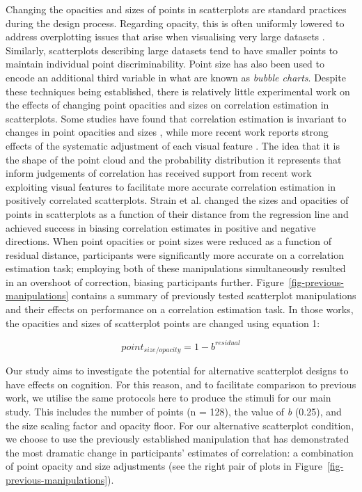 \documentclass[sigconf]{acmart}
\begin{document}
Changing the opacities and sizes of points in scatterplots are standard
practices during the design process. Regarding opacity, this is often
uniformly lowered to address overplotting issues that arise when
visualising very large datasets \citep{matejka_2015}. Similarly,
scatterplots describing large datasets tend to have smaller points to
maintain individual point discriminability. Point size has also been
used to encode an additional third variable in what are known as
\emph{bubble charts}. Despite these techniques being established, there
is relatively little experimental work on the effects of changing point
opacities and sizes on correlation estimation in scatterplots. Some
studies have found that correlation estimation is invariant to changes
in point opacities and sizes \citep{rensink_2014, rensink_2017}, while
more recent work reports strong effects of the systematic adjustment of
each visual feature \citep{strain_2023, strain_2023b, strain_2024}. The
idea that it is the shape of the point cloud and the probability
distribution it represents that inform judgements of correlation has
received support from recent work exploiting visual features to
facilitate more accurate correlation estimation in positively correlated
scatterplots. Strain et al.
\citep{strain_2023, strain_2023b, strain_2024} changed the sizes and
opacities of points in scatterplots as a function of their distance from
the regression line and achieved success in biasing correlation
estimates in positive and negative directions. When point opacities
\citep{strain_2023} or point sizes \citep{strain_2023b} were reduced as
a function of residual distance, participants were significantly more
accurate on a correlation estimation task; employing both of these
manipulations simultaneously \citep{strain_2024} resulted in an
overshoot of correction, biasing participants further.
Figure~\ref{fig-previous-manipulations} contains a summary of previously
tested scatterplot manipulations and their effects on performance on a
correlation estimation task. In those works, the opacities and sizes of
scatterplot points are changed using equation 1:

\begin{equation}
  point_{size/opacity} = 1 - b^{residual}
\end{equation}

Our study aims to investigate the potential for alternative scatterplot
designs to have effects on cognition. For this reason, and to facilitate
comparison to previous work, we utilise the same protocols here to
produce the stimuli for our main study. This includes the number of
points (n = 128), the value of \emph{b} (0.25), and the size scaling
factor and opacity floor. For our alternative scatterplot condition, we
choose to use the previously established manipulation that has
demonstrated the most dramatic change in participants' estimates of
correlation: a combination of point opacity and size adjustments
\citep{strain_2024} (see the right pair of plots in
Figure~\ref{fig-previous-manipulations}).
\end{document}
